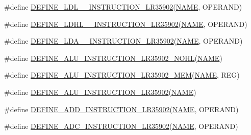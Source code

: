 \begin{DoxyCompactItemize}
\item 
\#define \mbox{\hyperlink{isa-lr35902_8c_a933ddbcc7602e5fecf75306d302fad22}{D\+E\+F\+I\+N\+E\+\_\+\+L\+D\+L\+\_\+\+\_\+\+I\+N\+S\+T\+R\+U\+C\+T\+I\+O\+N\+\_\+\+L\+R35902}}(\mbox{\hyperlink{inflate_8h_a164ea0159d5f0b5f12a646f25f99eceaa67bc2ced260a8e43805d2480a785d312}{N\+A\+ME}},  O\+P\+E\+R\+A\+ND)
\item 
\#define \mbox{\hyperlink{isa-lr35902_8c_a018d9ec0cb59ba9a11d9e389f8479e0c}{D\+E\+F\+I\+N\+E\+\_\+\+L\+D\+H\+L\+\_\+\+\_\+\+I\+N\+S\+T\+R\+U\+C\+T\+I\+O\+N\+\_\+\+L\+R35902}}(\mbox{\hyperlink{inflate_8h_a164ea0159d5f0b5f12a646f25f99eceaa67bc2ced260a8e43805d2480a785d312}{N\+A\+ME}},  O\+P\+E\+R\+A\+ND)
\item 
\#define \mbox{\hyperlink{isa-lr35902_8c_a55d7f65b51403e7d48734bc135f8bde8}{D\+E\+F\+I\+N\+E\+\_\+\+L\+D\+A\+\_\+\+\_\+\+I\+N\+S\+T\+R\+U\+C\+T\+I\+O\+N\+\_\+\+L\+R35902}}(\mbox{\hyperlink{inflate_8h_a164ea0159d5f0b5f12a646f25f99eceaa67bc2ced260a8e43805d2480a785d312}{N\+A\+ME}},  O\+P\+E\+R\+A\+ND)
\item 
\#define \mbox{\hyperlink{isa-lr35902_8c_acf6eeee6f2a9b23cf52be54e33db8ad9}{D\+E\+F\+I\+N\+E\+\_\+\+A\+L\+U\+\_\+\+I\+N\+S\+T\+R\+U\+C\+T\+I\+O\+N\+\_\+\+L\+R35902\+\_\+\+N\+O\+HL}}(\mbox{\hyperlink{inflate_8h_a164ea0159d5f0b5f12a646f25f99eceaa67bc2ced260a8e43805d2480a785d312}{N\+A\+ME}})
\item 
\#define \mbox{\hyperlink{isa-lr35902_8c_a367e55ba4f90eb207e3da6fe3a1d8d5e}{D\+E\+F\+I\+N\+E\+\_\+\+A\+L\+U\+\_\+\+I\+N\+S\+T\+R\+U\+C\+T\+I\+O\+N\+\_\+\+L\+R35902\+\_\+\+M\+EM}}(\mbox{\hyperlink{inflate_8h_a164ea0159d5f0b5f12a646f25f99eceaa67bc2ced260a8e43805d2480a785d312}{N\+A\+ME}},  R\+EG)
\item 
\#define \mbox{\hyperlink{isa-lr35902_8c_a08c2ca1ec4fdaffa0f5d67d8330b76dd}{D\+E\+F\+I\+N\+E\+\_\+\+A\+L\+U\+\_\+\+I\+N\+S\+T\+R\+U\+C\+T\+I\+O\+N\+\_\+\+L\+R35902}}(\mbox{\hyperlink{inflate_8h_a164ea0159d5f0b5f12a646f25f99eceaa67bc2ced260a8e43805d2480a785d312}{N\+A\+ME}})
\item 
\#define \mbox{\hyperlink{isa-lr35902_8c_a314b101f716343769a37639f04357050}{D\+E\+F\+I\+N\+E\+\_\+\+A\+D\+D\+\_\+\+I\+N\+S\+T\+R\+U\+C\+T\+I\+O\+N\+\_\+\+L\+R35902}}(\mbox{\hyperlink{inflate_8h_a164ea0159d5f0b5f12a646f25f99eceaa67bc2ced260a8e43805d2480a785d312}{N\+A\+ME}},  O\+P\+E\+R\+A\+ND)
\item 
\#define \mbox{\hyperlink{isa-lr35902_8c_a7bdd6800892d58bcaa0e239dfb95b5ff}{D\+E\+F\+I\+N\+E\+\_\+\+A\+D\+C\+\_\+\+I\+N\+S\+T\+R\+U\+C\+T\+I\+O\+N\+\_\+\+L\+R35902}}(\mbox{\hyperlink{inflate_8h_a164ea0159d5f0b5f12a646f25f99eceaa67bc2ced260a8e43805d2480a785d312}{N\+A\+ME}},  O\+P\+E\+R\+A\+ND)

\end{DoxyCompactItemize}
